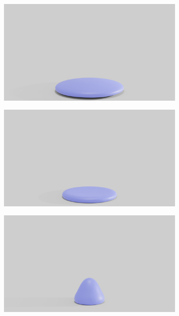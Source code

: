 \begin{figure}[htp!]
	\begin{subfigure}{.16\linewidth}
		\centering
		{\includegraphics[width=2.0\textwidth]{images/soft_ball/045/0300.jpg}}
		\label{sfig:ball-045-3}
	\end{subfigure}%
	\begin{subfigure}{.16\linewidth}
		\centering
		{\includegraphics[width=2.0\textwidth]{images/soft_ball/045/0350.jpg}}
		\label{sfig:ball-045-4}
	\end{subfigure}%
	\begin{subfigure}{.16\linewidth}
		\centering
		{\includegraphics[width=2.0\textwidth]{images/soft_ball/045/0400.jpg}}

\end{subfigure}
\end{figure}
